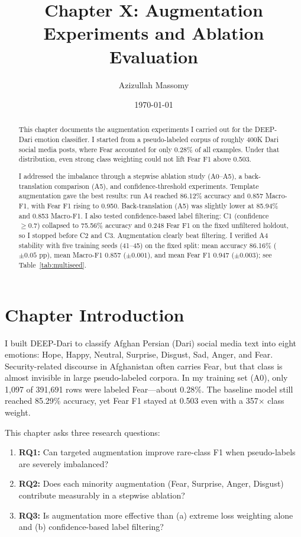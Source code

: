 \documentclass[11pt,a4paper]{article}
\title{Chapter X: Augmentation Experiments and Ablation Evaluation}
\author{Azizullah Massomy}
\date{\today}
\begin{document}
\maketitle

\begin{abstract}
This chapter documents the augmentation experiments I carried out for the DEEP-Dari emotion classifier. I started from a pseudo-labeled corpus of roughly 400K Dari social media posts, where Fear accounted for only 0.28\% of all examples. Under that distribution, even strong class weighting could not lift Fear F1 above 0.503.

I addressed the imbalance through a stepwise ablation study (A0--A5), a back-translation comparison (A5), and confidence-threshold experiments. Template augmentation gave the best results: run A4 reached 86.12\% accuracy and 0.857 Macro-F1, with Fear F1 rising to 0.950. Back-translation (A5) was slightly lower at 85.94\% and 0.853 Macro-F1. I also tested confidence-based label filtering: C1 (confidence $\geq 0.7$) collapsed to 75.56\% accuracy and 0.248 Fear F1 on the fixed unfiltered holdout, so I stopped before C2 and C3. Augmentation clearly beat filtering. I verified A4 stability with five training seeds (41--45) on the fixed split: mean accuracy 86.16\% ($\pm 0.05$ pp), mean Macro-F1 0.857 ($\pm 0.001$), and mean Fear F1 0.947 ($\pm 0.003$); see Table~\ref{tab:multiseed}.
\end{abstract}

\tableofcontents
\newpage

\section{Chapter Introduction}

I built DEEP-Dari to classify Afghan Persian (Dari) social media text into eight emotions: Hope, Happy, Neutral, Surprise, Disgust, Sad, Anger, and Fear. Security-related discourse in Afghanistan often carries Fear, but that class is almost invisible in large pseudo-labeled corpora. In my training set (A0), only 1,097 of 391,691 rows were labeled Fear---about 0.28\%. The baseline model still reached 85.29\% accuracy, yet Fear F1 stayed at 0.503 even with a 357$\times$ class weight.

This chapter asks three research questions:

\begin{enumerate}
    \item \textbf{RQ1:} Can targeted augmentation improve rare-class F1 when pseudo-labels are severely imbalanced?
    \item \textbf{RQ2:} Does each minority augmentation (Fear, Surprise, Anger, Disgust) contribute measurably in a stepwise ablation?
    \item \textbf{RQ3:} Is augmentation more effective than (a) extreme loss weighting alone and (b) confidence-based label filtering?
\end{enumerate}
\end{document}
